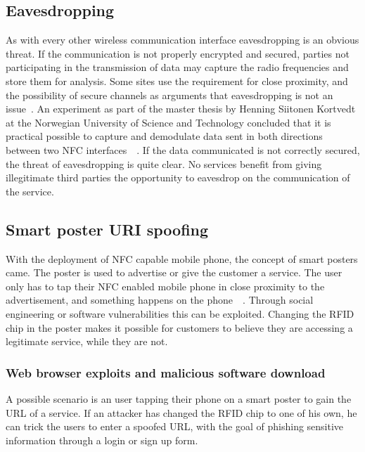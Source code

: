 \documentclass[a4paper,11pt]{article}
\begin{document}
\subsection{Eavesdropping}
As with every other wireless communication interface eavesdropping is an obvious threat. If the communication is not properly encrypted and secured, parties not participating in the transmission of data may capture the radio frequencies and store them for analysis. Some sites use the requirement for close proximity, and the possibility of secure channels as arguments that eavesdropping is not an issue~\cite{nfceaves}. An experiment as part of the master thesis by Henning Siitonen Kortvedt at the Norwegian University of Science and Technology concluded that it is practical possible to capture and demodulate data sent in both directions between two NFC interfaces~\cite{kortvedt2009eavesdropping}~\cite{kortvedt2009securing}. If the data communicated is not correctly secured, the threat of eavesdropping is quite clear. No services benefit from giving illegitimate third parties the opportunity to eavesdrop on the communication of the service.


\subsection{Smart poster URI spoofing}

With the deployment of NFC capable mobile phone, the concept of smart posters came.
The poster is used to advertise or give the customer a service. The user only has to tap their NFC enabled mobile phone in close proximity to the advertisement, and something happens on the phone~\cite{ruiz2009university}~\cite{smartposter}. Through social engineering or software vulnerabilities this can be exploited. Changing the RFID chip in the poster makes it possible for customers to believe they are accessing a legitimate service, while they are not. 

\subsubsection{Web browser exploits and malicious software download}

A possible scenario is an user tapping their phone on a smart poster to gain the URL of a service. If an attacker has changed the RFID chip to one of his own, he can trick the users to enter a spoofed URL, with the goal of phishing sensitive information through a login or sign up form. 
\end{document}
